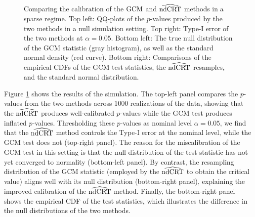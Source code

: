 \documentclass[aos]{imsart}
\theoremstyle{plain}
\theoremstyle{remark}
\newcommand{\GCM}{\textnormal{GCM}}						%
\newcommand{\ndCRThat}{\widehat{\textnormal{ndCRT}}}	%
\begin{document}
\begin{figure}
\begin{subfigure}[b]{0.49\textwidth}
		\end{subfigure}
		\caption{Comparing the calibration of the $\GCM$ and $\ndCRThat$ methods in a sparse regime. Top left: QQ-plots of the $p$-values produced by the two methods in a null simulation setting. Top right: Type-I error of the two methods at $\alpha = 0.05$. Bottom left: The true null distribution of the GCM statistic (gray histogram), as well as the standard normal density (red curve). Bottom right: Comparisons of the empirical CDFs of the GCM test statistics, the $\ndCRThat$ resamples, and the standard normal distribution.}
		\label{fig:dCRT_GCM_binomial_poisson} 
	\end{figure}

    Figure \ref{fig:dCRT_GCM_binomial_poisson} shows the results of the simulation. The top-left panel compares the $p$-values from the two methods across 1000 realizations of the data, showing that the $\ndCRThat$ produces well-calibrated $p$-values while the GCM test produces inflated $p$-values. Thresholding these $p$-values as nominal level $\alpha = 0.05$, we find that the $\ndCRThat$ method controls the Type-I error at the nominal level, while the GCM test does not (top-right panel). The reason for the miscalibration of the GCM test in this setting is that the null distribution of the test statistic has not yet converged to normality (bottom-left panel). By contrast, the resampling distribution of the GCM statistic (employed by the $\ndCRThat$ to obtain the critical value) aligns well with its null distribution (bottom-right panel), explaining the improved calibration of the $\ndCRThat$ method. Finally, the bottom-right panel shows the empirical CDF of the test statistics, which illustrates the difference in the null distributions of the two methods.
\end{document}
